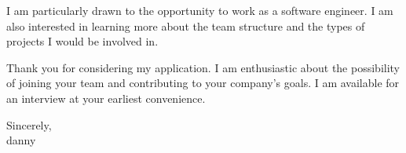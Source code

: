 \documentclass[letterpaper,11pt]{article}
\begin{document}
I am particularly drawn to the opportunity to work as a software engineer. I am also interested in learning more about the team structure and the types of projects I would be involved in.
\vspace{10pt}

Thank you for considering my application. I am enthusiastic about the possibility of joining your team and contributing to your company's goals. I am available for an interview at your earliest convenience.
\vspace{20pt}

Sincerely,\\
\vspace{40pt} %
danny

\end{document}

